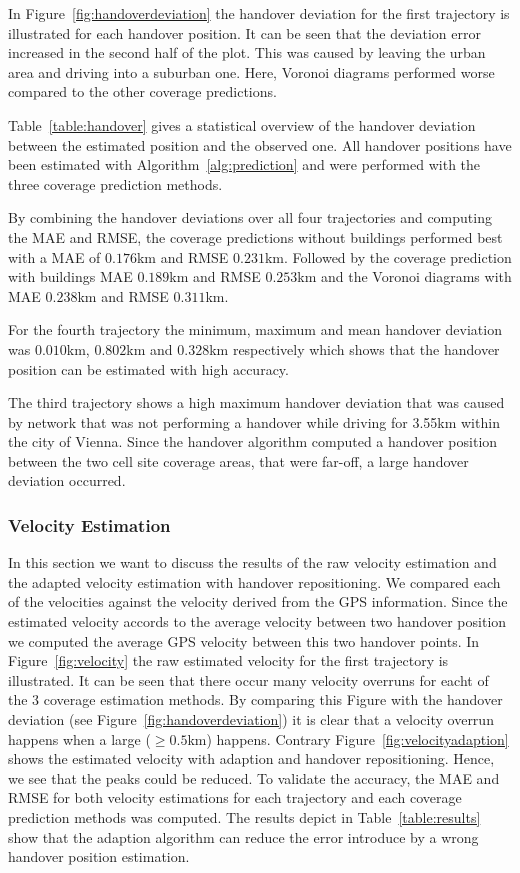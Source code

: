 \documentclass[twocolumn]{bmcart}%
\begin{document}
In Figure~\ref{fig:handoverdeviation} the handover deviation for the first trajectory is illustrated for each handover position. It can be seen that the deviation error increased in the second half of the plot. This was caused by leaving the urban area and driving into a suburban one. Here, Voronoi diagrams performed worse compared to the other coverage predictions.

Table~\ref{table:handover} gives a statistical overview of the handover deviation between the estimated position and the observed one. All handover positions have been estimated with Algorithm~\ref{alg:prediction} and were performed with the three coverage prediction methods. 

By combining the handover deviations over all four trajectories and computing the MAE and RMSE, the coverage predictions without buildings performed best with a MAE of $0.176$km and RMSE $0.231$km. Followed by the coverage prediction with buildings MAE $0.189$km and RMSE $0.253$km and the Voronoi diagrams with MAE $0.238$km and RMSE $0.311$km.

For the fourth trajectory the minimum, maximum and mean handover deviation was $0.010$km, $0.802$km and $0.328$km respectively which shows that the handover position can be estimated with high accuracy.

The third trajectory shows a high maximum handover deviation that was caused by network that was not performing a handover while driving for 3.55km within the city of Vienna. Since the handover algorithm computed a handover position between the two cell site coverage areas, that were far-off, a large handover deviation occurred.
\subsubsection*{Velocity Estimation}
In this section we want to discuss the results of the raw velocity estimation and the adapted velocity estimation with handover repositioning. We compared each of the velocities against the velocity derived from the GPS information. Since the estimated velocity accords to the average velocity between two handover position we computed the average GPS velocity between this two handover points. In Figure~\ref{fig:velocity} the raw estimated velocity for the first trajectory is illustrated. It can be seen that there occur many velocity overruns for eacht of the 3 coverage estimation methods. By comparing this Figure with the handover deviation (see Figure~\ref{fig:handoverdeviation}) it is clear that a velocity overrun happens when a large ($\ge0.5$km) happens. Contrary Figure~\ref{fig:velocityadaption} shows the estimated velocity with adaption and handover repositioning. Hence, we see that the peaks could be reduced. To validate the accuracy, the MAE and RMSE for both velocity estimations for each trajectory and each coverage prediction methods was computed. The results depict in Table~\ref{table:results} show that the adaption algorithm can reduce the error introduce by a wrong handover position estimation.
\end{document}
